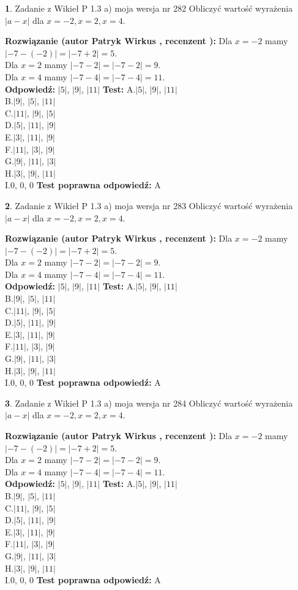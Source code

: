 \documentclass[12pt, a4paper]{article}
\theoremstyle{definition} %
\newtheorem{zad}{}
\newcommand{\zadStart}[1]{\begin{zad}#1\newline}
\newcommand{\zadStop}{\end{zad}}
\newcommand{\rozwStart}[2]{\noindent \textbf{Rozwiązanie (autor #1 , recenzent #2): }\newline}
\newcommand{\rozwStop}{\newline}
\newcommand{\odpStart}{\noindent \textbf{Odpowiedź:}\newline}
\newcommand{\odpStop}{\newline}
\newcommand{\testStart}{\noindent \textbf{Test:}\newline}
\newcommand{\testStop}{\newline}
\newcommand{\kluczStart}{\noindent \textbf{Test poprawna odpowiedź:}\newline}
\newcommand{\kluczStop}{\newline}
\begin{document}
\zadStart{Zadanie z Wikieł P 1.3 a) moja wersja nr 282}
Obliczyć wartość wyrażenia $|a - x|$ dla $x=-2,x=2,x=4$.
\zadStop
\rozwStart{Patryk Wirkus}{}
Dla $x = -2$ mamy $|-7 - (-2)| = |-7 + 2| = 5$.\\
Dla $x = 2$ mamy $|-7 - 2| = |-7 - 2| = 9$.\\
Dla $x = 4$ mamy $|-7 - 4| = |-7 - 4| = 11$.\\
\rozwStop
\odpStart
$|5|$, $|9|$, $|11|$
\odpStop
\testStart
A.$|5|$, $|9|$, $|11|$\\
B.$|9|$, $|5|$, $|11|$\\
C.$|11|$, $|9|$, $|5|$\\
D.$|5|$, $|11|$, $|9|$\\
E.$|3|$, $|11|$, $|9|$\\
F.$|11|$, $|3|$, $|9|$\\
G.$|9|$, $|11|$, $|3|$\\
H.$|3|$, $|9|$, $|11|$\\
I.$0$, $0$, $0$
\testStop
\kluczStart
A
\kluczStop



\zadStart{Zadanie z Wikieł P 1.3 a) moja wersja nr 283}
Obliczyć wartość wyrażenia $|a - x|$ dla $x=-2,x=2,x=4$.
\zadStop
\rozwStart{Patryk Wirkus}{}
Dla $x = -2$ mamy $|-7 - (-2)| = |-7 + 2| = 5$.\\
Dla $x = 2$ mamy $|-7 - 2| = |-7 - 2| = 9$.\\
Dla $x = 4$ mamy $|-7 - 4| = |-7 - 4| = 11$.\\
\rozwStop
\odpStart
$|5|$, $|9|$, $|11|$
\odpStop
\testStart
A.$|5|$, $|9|$, $|11|$\\
B.$|9|$, $|5|$, $|11|$\\
C.$|11|$, $|9|$, $|5|$\\
D.$|5|$, $|11|$, $|9|$\\
E.$|3|$, $|11|$, $|9|$\\
F.$|11|$, $|3|$, $|9|$\\
G.$|9|$, $|11|$, $|3|$\\
H.$|3|$, $|9|$, $|11|$\\
I.$0$, $0$, $0$
\testStop
\kluczStart
A
\kluczStop



\zadStart{Zadanie z Wikieł P 1.3 a) moja wersja nr 284}
Obliczyć wartość wyrażenia $|a - x|$ dla $x=-2,x=2,x=4$.
\zadStop
\rozwStart{Patryk Wirkus}{}
Dla $x = -2$ mamy $|-7 - (-2)| = |-7 + 2| = 5$.\\
Dla $x = 2$ mamy $|-7 - 2| = |-7 - 2| = 9$.\\
Dla $x = 4$ mamy $|-7 - 4| = |-7 - 4| = 11$.\\
\rozwStop
\odpStart
$|5|$, $|9|$, $|11|$
\odpStop
\testStart
A.$|5|$, $|9|$, $|11|$\\
B.$|9|$, $|5|$, $|11|$\\
C.$|11|$, $|9|$, $|5|$\\
D.$|5|$, $|11|$, $|9|$\\
E.$|3|$, $|11|$, $|9|$\\
F.$|11|$, $|3|$, $|9|$\\
G.$|9|$, $|11|$, $|3|$\\
H.$|3|$, $|9|$, $|11|$\\
I.$0$, $0$, $0$
\testStop
\kluczStart
A
\kluczStop
\end{document}
